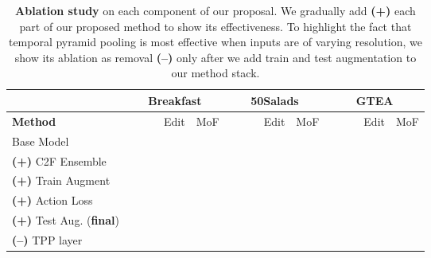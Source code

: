 \documentclass[10pt,twocolumn,letterpaper]{article}
\begin{document}
\begin{table*}[t]
\begin{center}
\small{
\begin{tabular}{p{2.7cm} | p{0.5cm}p{0.5cm}p{0.5cm}p{0.5cm}p{0.6cm} | p{0.5cm}p{0.5cm}p{0.5cm}p{0.5cm}p{0.6cm} | p{0.5cm}p{0.5cm}p{0.5cm}p{0.5cm}p{0.6cm}}
\hline
& \multicolumn{5}{c|}{Breakfast} & \multicolumn{5}{c|}{50Salads} & \multicolumn{5}{c}{GTEA} \\
\hline\hline
\textbf{Method} & \multicolumn{3}{c}{} & Edit & MoF & \multicolumn{3}{c}{} & Edit & MoF & \multicolumn{3}{c}{} & Edit & MoF\\
\hline
Base Model  &  &  &  &  &  & 
                 &  &  &  &  & 
                 &  &  &  & \\ 
 \textbf{(+)} C2F Ensemble &  &  &  &  & 
                            & &  &  & &
                            & &  & &&  \\
 \textbf{(+)} Train Augment &  &  &  &  &  & 
                  &  &  &  &  & 
                  &  &  &  &  \\
 \textbf{(+)} Action Loss &  &  &  &  &  & 
                 &  &  &  &  & 
                 &  &  &  &  \\
 \textbf{(+)} Test Aug. (\textbf{final}) &  &  &  &  &  
                &  &  &  &  &  & 
                 &  &  &  &  \\
 \textbf{(--)} TPP layer  &  &  &  &  &  &
                 &  &  &  &  & 
                 &  &  &  &  \\
\hline\hline
\end{tabular}
}
\end{center}
\caption{\textbf{Ablation study} on each component of our proposal. We gradually add \textbf{(+)} each part of our proposed method to show its effectiveness. To highlight the fact that temporal pyramid pooling is most effective when inputs are of varying resolution, we show its ablation as removal \textbf{(--)} only after we add train and test augmentation to our method stack.}\label{tab:ablation}
\end{table*}
\end{document}
